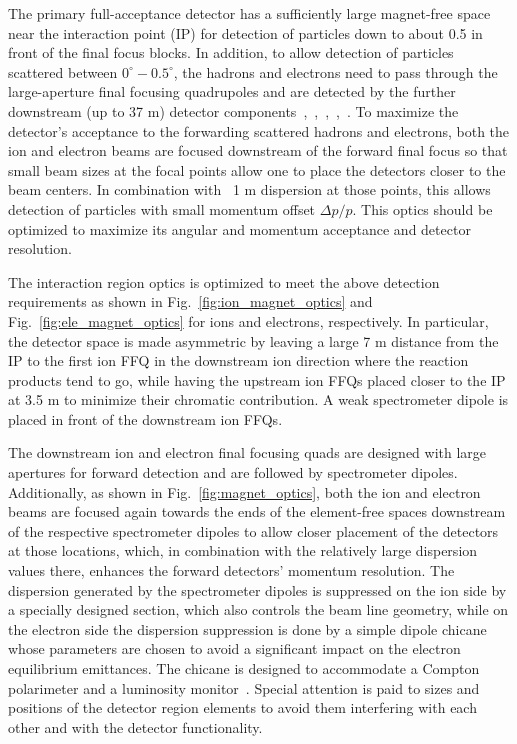 The primary full-acceptance detector has a sufficiently large magnet-free space near the interaction point (IP) for detection of particles down to about 0.5 in front of the final focus blocks. In addition, to allow detection of particles scattered between $0^{\circ}-0.5^{\circ}$, the hadrons and electrons need to pass through the large-aperture final focusing quadrupoles and are detected by the further downstream (up to 37 m) detector components~\cite{Abeyratne:2012ah},~\cite{Abeyratne:2015pma},~\cite{Lin:2013},~\cite{Morozov:2012},~\cite{Morozov:2014}. 
To maximize the detector’s acceptance to the forwarding scattered hadrons and electrons, both the ion and electron beams are focused downstream of the forward final focus so that small beam sizes at the focal points allow one to place the detectors closer to the beam centers. In combination with ~1 m dispersion at those points, this allows detection of particles with small momentum offset $\Delta p/p$. This optics should be optimized to maximize its angular and momentum acceptance and detector resolution. 

The interaction region optics is optimized to meet the above detection requirements as shown in Fig.~\ref{fig:ion_magnet_optics} and Fig.~\ref{fig:ele_magnet_optics} for ions and electrons, respectively. In particular, the detector space is made asymmetric by leaving a large 7 m distance from the IP to the first ion FFQ in the downstream ion direction where the reaction products tend to go, while having the upstream ion FFQs placed closer to the IP at 3.5 m to minimize their chromatic contribution. A weak spectrometer dipole is placed in front of the downstream ion FFQs.

The downstream ion and electron final focusing quads are designed with large apertures for forward detection and are followed by spectrometer dipoles. Additionally, as shown in Fig.~\ref{fig:magnet_optics}, both the ion and electron beams are focused again towards the ends of the element-free spaces downstream of the respective spectrometer dipoles to allow closer placement of the detectors at those locations, which, in combination with the relatively large dispersion values there, enhances the forward detectors’ momentum resolution. The dispersion generated by the spectrometer dipoles is suppressed on the ion side by a specially designed section, which also controls the beam line geometry, while on the electron side the dispersion suppression is done by a simple dipole chicane whose parameters are chosen to avoid a significant impact on the electron equilibrium emittances. The chicane is designed to accommodate a Compton polarimeter and a luminosity monitor~\cite{Morozov:2014}.  Special attention is paid to sizes and positions of the detector region elements to avoid them interfering with each other and with the detector functionality. 

